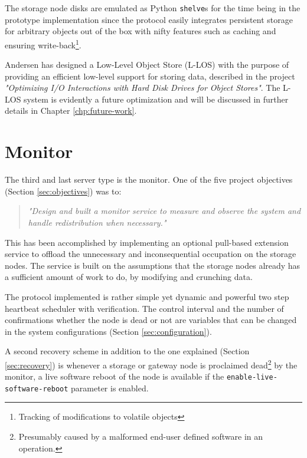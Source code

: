 The storage node disks are emulated as Python \texttt{shelve}s \cite{PageShelve} for the time being in the prototype implementation since the protocol easily integrates persistent storage for arbitrary objects out of the box with nifty features such as caching and ensuring write-back\footnote{Tracking of modifications to volatile objects}.

Andersen has designed a Low-Level Object Store (L-LOS) with the purpose of providing an efficient low-level support for storing data, described in the project \textit{"Optimizing I/O Interactions with Hard Disk Drives for Object Stores"}\cite{andersen2016}. The L-LOS system is evidently a future optimization and will be discussed in further details in Chapter \ref{chp:future-work}. 

\section{Monitor} \label{sec:monitor}
The third and last server type is the monitor. One of the five project objectives (Section \ref{sec:objectives}) was to:

\begin{quotation}
	\textit{"Design and built a monitor service to measure and observe the system and handle redistribution when necessary."}
\end{quotation}

This has been accomplished by implementing an optional pull-based extension service to offload the unnecessary and inconsequential 	occupation on the storage nodes. The service is built on the assumptions that the storage nodes already has a sufficient amount of work to do, by modifying and crunching data.
\newline

The protocol implemented is rather simple yet dynamic and powerful two step heartbeat scheduler with verification. The control interval and the number of confirmations whether the node is dead or not are variables that can be changed in the system configurations (Section \ref{sec:configuration}). 
\newpage

A second recovery scheme in addition to the one explained (Section \ref{sec:recovery}) is whenever a storage or gateway node is proclaimed dead\footnote{Presumably caused by a malformed end-user defined software in an operation.} by the monitor, a live software reboot of the node is available if the \texttt{enable-live-software-reboot} parameter is enabled.
